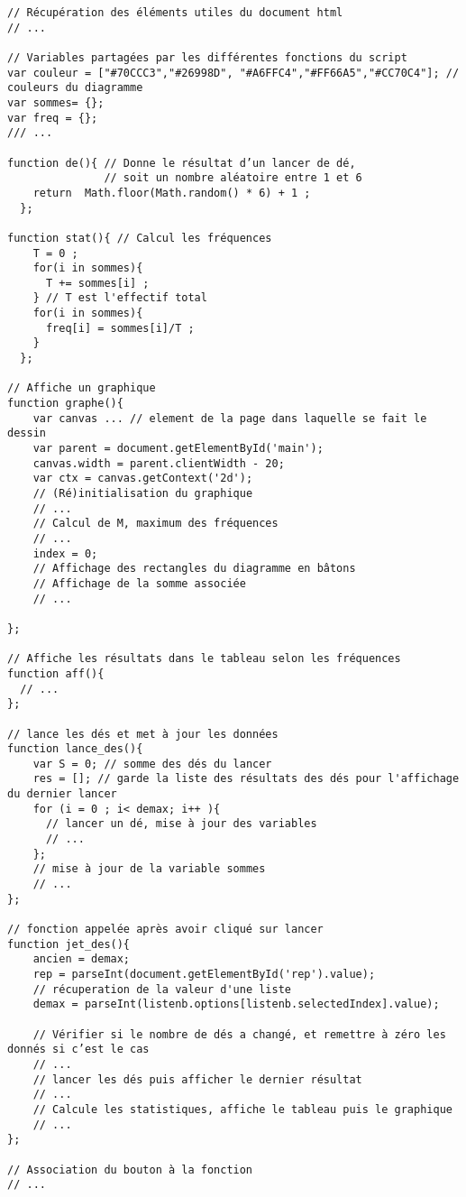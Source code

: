 \documentclass[10pt,french,A4]{article}
\theoremstyle{plain}
\begin{document}
\begin{verbatim}
// Récupération des éléments utiles du document html
// ...

// Variables partagées par les différentes fonctions du script
var couleur = ["#70CCC3","#26998D", "#A6FFC4","#FF66A5","#CC70C4"]; // couleurs du diagramme
var sommes= {};
var freq = {};
/// ...

function de(){ // Donne le résultat d’un lancer de dé,
               // soit un nombre aléatoire entre 1 et 6
    return  Math.floor(Math.random() * 6) + 1 ;
  };

function stat(){ // Calcul les fréquences
    T = 0 ;
    for(i in sommes){
      T += sommes[i] ;
    } // T est l'effectif total
    for(i in sommes){
      freq[i] = sommes[i]/T ;
    }
  };

// Affiche un graphique
function graphe(){
    var canvas ... // element de la page dans laquelle se fait le dessin
    var parent = document.getElementById('main');
    canvas.width = parent.clientWidth - 20;
    var ctx = canvas.getContext('2d');
    // (Ré)initialisation du graphique
    // ...
    // Calcul de M, maximum des fréquences
    // ...
    index = 0;
    // Affichage des rectangles du diagramme en bâtons
    // Affichage de la somme associée
    // ...

};

// Affiche les résultats dans le tableau selon les fréquences
function aff(){
  // ...
};

// lance les dés et met à jour les données
function lance_des(){
    var S = 0; // somme des dés du lancer
    res = []; // garde la liste des résultats des dés pour l'affichage du dernier lancer
    for (i = 0 ; i< demax; i++ ){
      // lancer un dé, mise à jour des variables
      // ...
    };
    // mise à jour de la variable sommes
    // ...
};

// fonction appelée après avoir cliqué sur lancer
function jet_des(){
    ancien = demax;
    rep = parseInt(document.getElementById('rep').value);
    // récuperation de la valeur d'une liste 
    demax = parseInt(listenb.options[listenb.selectedIndex].value);

    // Vérifier si le nombre de dés a changé, et remettre à zéro les donnés si c’est le cas
    // ...
    // lancer les dés puis afficher le dernier résultat
    // ...
    // Calcule les statistiques, affiche le tableau puis le graphique
    // ...
};

// Association du bouton à la fonction
// ...
\end{verbatim}
\end{document}
